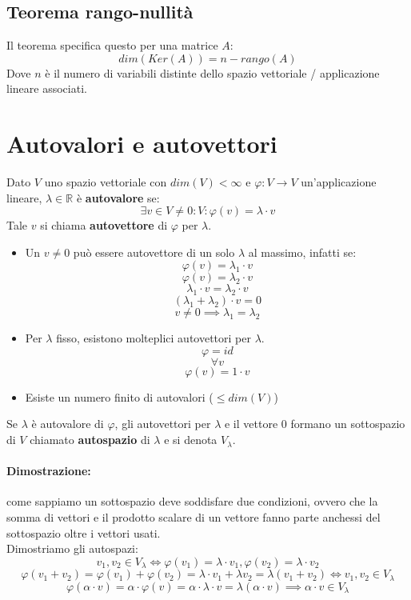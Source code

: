 \documentclass[12pt,a4paper]{article}
\let\oldsection\section
\renewcommand{\section}{\clearpage\oldsection}
\begin{document}
\subsection{Teorema rango-nullità}
Il teorema specifica questo per una matrice $A$:
\[
dim(Ker(A)) = n - rango(A)
\]
Dove $n$ è il numero di variabili distinte dello spazio vettoriale / applicazione lineare associati.

\section{Autovalori e autovettori}
Dato $V$ uno spazio vettoriale con $dim(V) < \infty$ e $\varphi:V \to V$ un'applicazione lineare, $\lambda \in \mathbb{R}$ è \textbf{autovalore} se:
\[
\exists v \in V \ne 0 : V: \varphi(v) = \lambda \cdot v
\]
Tale $v$ si chiama \textbf{autovettore} di $\varphi$ per $\lambda$.\\
\begin{itemize}
  \item Un $v \ne 0$ può essere autovettore di un solo $\lambda$ al massimo, infatti se:
  \[
  \varphi(v) = \lambda_1 \cdot v
  \]
  \[
  \varphi(v) = \lambda_2 \cdot v
  \]
  \[
  \lambda_1 \cdot v = \lambda_2 \cdot v
  \]
  \[
  (\lambda_1 + \lambda_2) \cdot v = 0
  \]
  \[
  v \ne 0 \implies \lambda_1 = \lambda_2
  \]
  \item Per $\lambda$ fisso, esistono molteplici autovettori per $\lambda$.
  \[
  \varphi = id
  \]
  \[
  \forall v
  \]
  \[
  \varphi(v) = 1 \cdot v
  \]
  \item Esiste un numero finito di autovalori ($\leq dim(V)$)
\end{itemize}
Se $\lambda$ è autovalore di $\varphi$, gli autovettori per $\lambda$ e il vettore $0$ formano un sottospazio di $V$ chiamato \textbf{autospazio} di $\lambda$ e si denota $V_{\lambda}$.
\paragraph{Dimostrazione: }come sappiamo un sottospazio deve soddisfare due condizioni, ovvero che la somma di vettori e il prodotto scalare di un vettore fanno parte anchessi del sottospazio oltre i vettori usati.\\
Dimostriamo gli autospazi:\\
\[
v_1,v_2 \in V_{\lambda} \Leftrightarrow \varphi(v_1) = \lambda \cdot v_1, \varphi(v_2) = \lambda \cdot v_2
\]
\[
\varphi(v_1 + v_2) = \varphi(v_1) + \varphi(v_2) = \lambda \cdot v_1 + \lambda v_2 = \lambda(v_1 + v_2) \Leftrightarrow v_1, v_2 \in V_{\lambda}
\]
\[
\varphi(\alpha \cdot v) = \alpha \cdot \varphi(v) = \alpha \cdot \lambda \cdot v = \lambda(\alpha \cdot v) \implies \alpha \cdot v \in V_{\lambda}
\]
\end{document}
